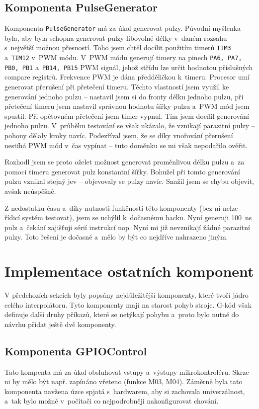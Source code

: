 		\subsection{Komponenta PulseGenerator}
		
		Komponenta {\tt PulseGenerator} má za úkol generovat pulzy. Původní myšlenka byla, aby byla schopna generovat pulzy libovolné délky v~daném rozsahu s~největší možnou přesností. Toho jsem chtěl docílit použitím timerů {\tt TIM3} a~{\tt TIM12} v~PWM módu. V~PWM módu generují timery na pinech {\tt PA6, PA7, PB0, PB1} a~{\tt PB14, PB15} PWM signál\cite{refman}, jehož střídu lze určit hodnotou příslušných compare registrů. Frekvence PWM je dána předděličkou k~timeru. Procesor umí generovat přerušení při přetečení timeru\cite{refman}. Těchto vlastností jsem využil ke generování jednoho pulzu -- nastavil jsem si do fronty délku jednoho pulzu, při přetečení timeru jsem nastavil správnou hodnotu šířky pulzu a~PWM mód jsem spustil. Při opětovném přetečení jsem timer vypnul. Tím jsem docílil generování jednoho pulzu. V~průběhu testování se však ukázalo, že vznikají parazitní pulzy -- pohony dělaly kroky navíc. Podezříval jsem, že se díky vnořování přerušení nestíhá PWM mód v~čas vypínat -- tuto doměnku se mi však nepodařilo ověřit.
		
		Rozhodl jsem se proto oželet možnost generovat proměnlivou délku pulzu a~za pomoci timeru generovat pulz konstantní šířky. Bohužel při tomto generování pulzu vznikal stejný jev -- objevovaly se pulzy navíc. Snažil jsem se chybu objevit, avšak neúspěšně.
		
		Z nedostatku času a~díky nutnosti funkčnosti této komponenty (bez ní nelze řídicí systém testovat), jsem se uchýlil k~dočasnému hacku. Nyní generuji 100~ns pulz a~čekání zajišťuji sérií instrukcí nop. Nyní mi již nevznikají žádné parazitní pulzy. Toto řešení je dočasné a~mělo by být co nejdříve nahrazeno jiným.

	
	\section{Implementace ostatních komponent}
	V předchozích sekcích byly popsány nejdůležitější komponenty, které tvoří jádro celého interpolátoru. Tyto komponenty mají na starost pohyb stroje. G-kód však definuje další druhy příkazů, které se netýkají pohybu a~proto bylo nutné do návrhu přidat ještě dvě komponenty.
	
		\subsection{Komponenta GPIOControl}
		Tato kompenta má za úkol obsluhovat vstupy a~výstupy mikrokontroléru. Skrze ni by mělo být např. zapínáno vřeteno (funkce M03, M04\cite{gcode}). Záměrně byla tato komponenta navžena úzce spjatá s~hardwarem, aby si zachovala univerzálnost, a~tak bylo možné v~počítači co nejpodrobněji nakonfigurovat chování.
		
